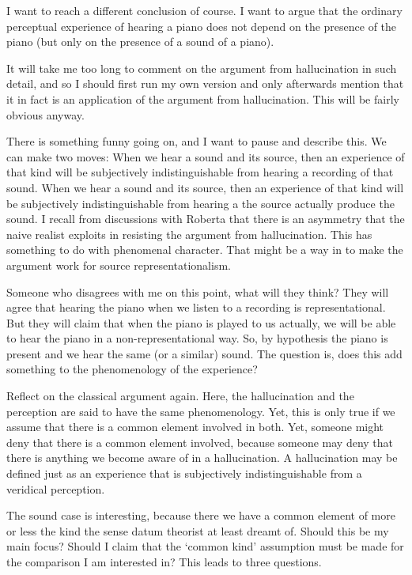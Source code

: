 \documentclass[sloppy, journal, git, bytitle, dodraft]{humapap}
\begin{document}
I want to reach a different conclusion of course. I want to argue that the ordinary perceptual experience of hearing a piano does not depend on the presence of the piano (but only on the presence of a sound of a piano). 

It will take me too long to comment on the argument from hallucination in such detail, and so I should first run my own version and only afterwards mention that it in fact is an application of the argument from hallucination. This will be fairly obvious anyway.

There is something funny going on, and I want to pause and describe this. We can make two moves: 
When we hear a sound and its source, then an experience of that kind will be subjectively indistinguishable from hearing  a recording of that sound. 
When we hear a sound and its source, then an experience of that kind will be subjectively indistinguishable from hearing a the source actually produce the sound.
I recall from discussions with Roberta that there is an asymmetry that the naive realist exploits in resisting the argument from hallucination. This has something to do with phenomenal character. That might be a way in to make the argument work for source representationalism. 

Someone who disagrees with me on this point, what will they think? They will agree that hearing the piano when we listen to a recording is representational. But they will claim that when the piano is played to us actually, we will be able to hear the piano in a non-representational way. So, by hypothesis the piano is present and we hear the same (or a similar) sound. The question is, does this add something to the phenomenology of the experience? 

Reflect on the classical argument again. Here, the hallucination and the perception are said to have the same phenomenology. Yet, this is only true if we assume that there is a common element involved in both. Yet, someone might deny that there is a common element involved, because someone may deny that there is anything we become aware of in a hallucination. A hallucination may be defined just as an experience that is subjectively indistinguishable from a veridical perception. 

The sound case is interesting, because there we have a common element of more or less the kind the sense datum theorist at least dreamt of. Should this be my main focus? Should I claim that the `common kind' assumption must be made for the comparison I am interested in? This leads to three questions. 
\end{document}
